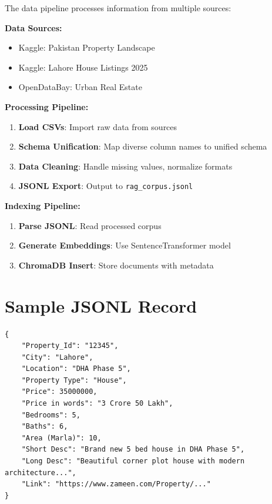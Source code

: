 The data pipeline processes information from multiple sources:

\textbf{Data Sources:}
\begin{itemize}
    \item Kaggle: Pakistan Property Landscape
    \item Kaggle: Lahore House Listings 2025
    \item OpenDataBay: Urban Real Estate
\end{itemize}

\textbf{Processing Pipeline:}
\begin{enumerate}
    \item \textbf{Load CSVs}: Import raw data from sources
    \item \textbf{Schema Unification}: Map diverse column names to unified schema
    \item \textbf{Data Cleaning}: Handle missing values, normalize formats
    \item \textbf{JSONL Export}: Output to \texttt{rag\_corpus.jsonl}
\end{enumerate}

\textbf{Indexing Pipeline:}
\begin{enumerate}
    \item \textbf{Parse JSONL}: Read processed corpus
    \item \textbf{Generate Embeddings}: Use SentenceTransformer model
    \item \textbf{ChromaDB Insert}: Store documents with metadata
\end{enumerate}

\section{Sample JSONL Record}

\begin{lstlisting}[caption={Sample Property Record in JSONL Format}, label=lst:sample-jsonl]
{
    "Property_Id": "12345",
    "City": "Lahore",
    "Location": "DHA Phase 5",
    "Property Type": "House",
    "Price": 35000000,
    "Price in words": "3 Crore 50 Lakh",
    "Bedrooms": 5,
    "Baths": 6,
    "Area (Marla)": 10,
    "Short Desc": "Brand new 5 bed house in DHA Phase 5",
    "Long Desc": "Beautiful corner plot house with modern architecture...",
    "Link": "https://www.zameen.com/Property/..."
}
\end{lstlisting}
